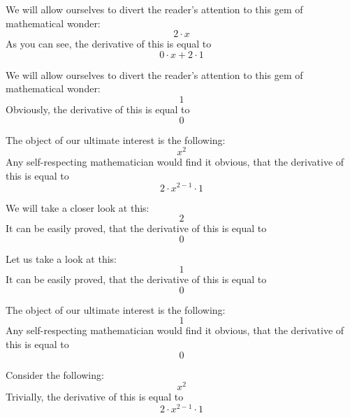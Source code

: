 \documentclass{article}
\begin{document}
We will allow ourselves to divert the reader's attention to this gem of mathematical wonder:
\begin{equation}
2 \cdot x 
\end{equation}
As you can see, the derivative of this is equal to
\begin{equation}
0 \cdot x + 2 \cdot 1 
\end{equation}

We will allow ourselves to divert the reader's attention to this gem of mathematical wonder:
\begin{equation}
1 
\end{equation}
Obviously, the derivative of this is equal to
\begin{equation}
0 
\end{equation}

The object of our ultimate interest is the following:
\begin{equation}
x ^{2 } 
\end{equation}
Any self-respecting mathematician would find it obvious, that the derivative of this is equal to
\begin{equation}
2 \cdot x ^{2 - 1 } \cdot 1 
\end{equation}

We will take a closer look at this:
\begin{equation}
2 
\end{equation}
It can be easily proved, that the derivative of this is equal to
\begin{equation}
0 
\end{equation}

Let us take a look at this:
\begin{equation}
1 
\end{equation}
It can be easily proved, that the derivative of this is equal to
\begin{equation}
0 
\end{equation}

The object of our ultimate interest is the following:
\begin{equation}
1 
\end{equation}
Any self-respecting mathematician would find it obvious, that the derivative of this is equal to
\begin{equation}
0 
\end{equation}

Consider the following:
\begin{equation}
x ^{2 } 
\end{equation}
Trivially, the derivative of this is equal to
\begin{equation}
2 \cdot x ^{2 - 1 } \cdot 1 
\end{equation}
\end{document}
